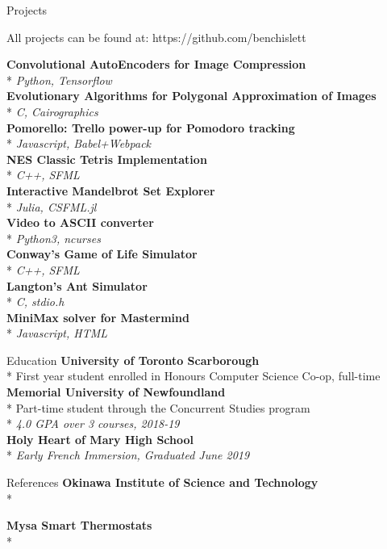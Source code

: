 \documentclass[11pt, letterpaper]{article}
\begin{document}
\begin{section}{Projects}

All projects can be found at:
https://github.com/benchislett

\begin{multicols}{2}
\textbf{Convolutional AutoEncoders for Image Compression}\\*
\textit{Python, Tensorflow}\\

\textbf{Evolutionary Algorithms for Polygonal Approximation of Images}\\*
\textit{C, Cairographics}\\

\textbf{Pomorello: Trello power-up for Pomodoro tracking}\\*
\textit{Javascript, Babel+Webpack}\\

\textbf{NES Classic Tetris Implementation}\\*
\textit{C++, SFML}\\

\textbf{Interactive Mandelbrot Set Explorer}\\*
\textit{Julia, CSFML.jl}\\

\textbf{Video to ASCII converter}\\*
\textit{Python3, ncurses}\\

\textbf{Conway's Game of Life Simulator}\\*
\textit{C++, SFML}\\

\textbf{Langton's Ant Simulator}\\*
\textit{C, stdio.h}\\

\textbf{MiniMax solver for Mastermind}\\*
\textit{Javascript, HTML}
\end{multicols}
\end{section}

\begin{section}{Education}
\textbf{University of Toronto Scarborough}\\*
First year student enrolled in Honours Computer Science Co-op, full-time\\

\textbf{Memorial University of Newfoundland}\\*
Part-time student through the Concurrent Studies program\\*
\textit{4.0 GPA over 3 courses, 2018-19}\\

\textbf{Holy Heart of Mary High School}\\*
\textit{Early French Immersion, Graduated June 2019}
\end{section}

\begin{section}{References}
\textbf{Okinawa Institute of Science and Technology}\\*

\textbf{Mysa Smart Thermostats}\\*


\end{section}
\end{document}
